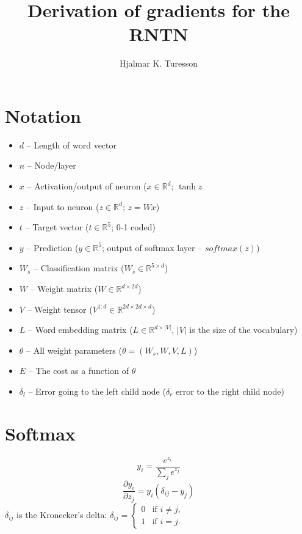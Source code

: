 \documentclass{article}
\begin{document}
\title{Derivation of gradients for the RNTN}
\author{Hjalmar K. Turesson}
\maketitle

\section*{Notation}
	\begin{itemize}
		\item$d$   -- Length of word vector
		\item$n$   -- Node/layer
		\item$x$   -- Activation/output of neuron ($x \in \mathbb{R}^{d}$; $\tanh z$
		\item$z$   -- Input to neuron ($z \in \mathbb{R}^{d}$; $z = Wx$)
		\item$t$   -- Target vector ($t \in \mathbb{R}^5$; 0-1 coded)
		\item$y$   -- Prediction ($y \in \mathbb{R}^5$; output of softmax layer -- $softmax(z)$)
		\item$W_s$ -- Classification matrix ($W_s \in \mathbb{R}^{5 \times d}$)
		\item$W$ -- Weight matrix ($W \in \mathbb{R}^{d \times 2d}$)
		\item$V$   -- Weight tensor ($V^{1:d} \in \mathbb{R}^{2d \times 2d \times d} $)
		\item$L$ -- Word embedding matrix ($L \in \mathbb{R}^{d \times |V|}$, $|V|$ is the size of the vocabulary)
		\item$\theta$ -- All weight parameters ($\theta = (W_s, W, V, L)$)
		\item$E$ -- The cost as a function of $\theta$
		\item$\delta_l$ -- Error going to the left child node ($\delta_r$ error to the right child node)
	\end{itemize}

\section*{Softmax}
\begin{equation}
y_{i} = \frac{e^{z_i}}{\sum\limits_{j}e^{z_j}}
\end{equation}
	\begin{equation}
		\frac{\partial y_i}{\partial z_j} = y_{i}(\delta_{ij} - y_{j})
	\end{equation}
	$\delta_{ij}$ is the Kronecker's delta:
	$ \delta_{ij} = \begin{cases}
	0 &\text{if } i \neq j,   \\
	1 &\text{if } i=j.   \end{cases} $
\end{document}
